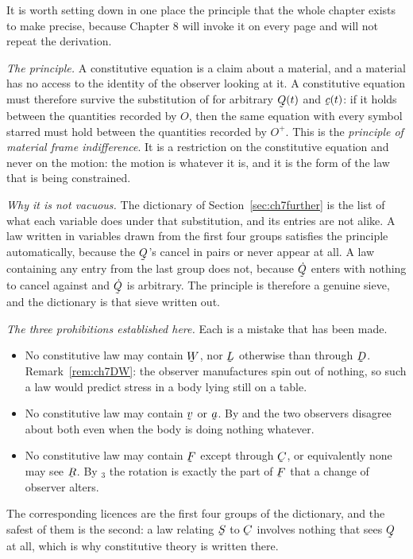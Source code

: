 \begin{remark}\label{rem:ch7mfi}
It is worth setting down in one place the principle that the whole
chapter exists to make precise, because Chapter 8 will invoke it on every
page and will not repeat the derivation.

\emph{The principle.} A constitutive equation is a claim about a
material, and a material has no access to the identity of the observer
looking at it. A constitutive equation must therefore survive the
substitution of  for arbitrary $\bQ(t)$ and $\bc(t)$: if it
holds between the quantities recorded by $O$, then the same equation with
every symbol starred must hold between the quantities recorded by
$O^{+}$. This is the \emph{principle of material frame indifference}. It
is a restriction on the constitutive equation and never on the motion:
the motion is whatever it is, and it is the form of the law that is being
constrained.

\emph{Why it is not vacuous.} The dictionary of
Section~\ref{sec:ch7further} is the list of what each variable does under
that substitution, and its entries are not alike. A law written in
variables drawn from the first four groups satisfies the principle
automatically, because the $\bQ$'s cancel in pairs or never appear at
all. A law containing any entry from the last group does not, because
$\dot\bQ$ enters with nothing to cancel against and $\dot\bQ$ is
arbitrary. The principle is therefore a genuine sieve, and the dictionary
is that sieve written out.

\emph{The three prohibitions established here.} Each is a mistake that
has been made.
\begin{itemize}\itemsep2pt
\item No constitutive law may contain $\bW$, nor $\bL$ otherwise than
      through $\bD$. Remark~\ref{rem:ch7DW}: the observer manufactures
      spin out of nothing, so such a law would predict stress in a body
      lying still on a table.
\item No constitutive law may contain $\bv$ or $\ba$. By  and
       the two observers disagree about both even when the body
      is doing nothing whatever.
\item No constitutive law may contain $\bF$ except through $\bC$, or
      equivalently none may see $\bR$. By $_{3}$ the rotation
      is exactly the part of $\bF$ that a change of observer alters.
\end{itemize}
The corresponding licences are the first four groups of the dictionary,
and the safest of them is the second: a law relating $\bS$ to $\bC$
involves nothing that sees $\bQ$ at all, which is why constitutive theory
is written there.


\end{remark}
